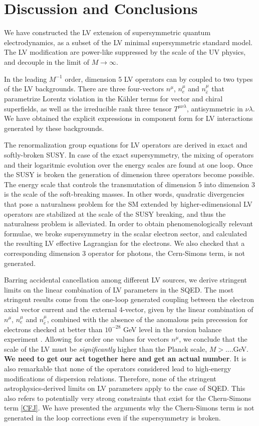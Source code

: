 \documentclass[paper,12pt]{revtex4}
\begin{document}
\section{Discussion and Conclusions}

We have constructed the LV extension of supersymmetric quantum electrodynamics,
as a subset of the LV minimal supersymmetric standard model.
The LV modification are power-like suppressed by the scale of the UV physics,
and decouple in the limit of $M\to \infty$. 

In the leading $M^{-1}$ order, dimension 5 LV operators can by coupled to
two types of the LV backgrounds. There are three four-vectors $n^\mu$, $n^\mu_e$ and $n^{\mu}_{\bar e}$
that parametrize Lorentz violation in the K\"ahler terms for vector and chiral superfields, 
as well as the irreducible rank three tensor $T^{\mu\nu\lambda}$, antisymmetric in $\nu\lambda$. 
We have obtained the explicit expressions in component form for LV interactions generated by these 
backgrounds. 

The renormalization group equations for LV operators are derived 
in exact and softly-broken SUSY. In case of the exact supersymmetry, 
the mixing of operators and their logaritmic evolution over the energy scales are 
found at one loop. Once the SUSY is broken the generation of dimension 
three operators become possible. The energy scale that controls the transmutation 
of dimension 5 into dimension 3 is the scale of the soft-breaking masses. 
In other words, quadratic divergencies that pose a naturalness problem for the 
SM extended by higher-edimensional LV operators are stabilized at the scale of the 
SUSY breaking, and thus the naturalness problem is alleviated. 
In order to obtain phenomenologically relevant formulae, we broke supersymmetry in the
scalar electron sector, and calculated the resulting LV effective Lagrangian for the 
electrons. We also checked that a corresponding dimension 3 operator for photons, 
the Cern-Simons term, is not generated. 

Barring accidental cancellation among different LV sources, we derive 
stringent limits on the linear combination of LV parameters in the 
SQED. The most stringent results come from the one-loop generated 
coupling between the electron axial vector current and the external 
4-vector, given by the linear combination of $n^\mu$, $n^\mu_e$ and $n^{\mu}_{\bar e}$,
combined with the absence of the anomalous psin precession for 
electrons checked at better than $10^{-28}$ GeV level in the 
torsion balance experiment \cite{Heckel:1999sy}. Allowing for order one values for 
vectors $n^\mu$, we conclude that the scale of the LV must be {\em significantly}
higher than the Planck scale, $M> $....GeV. {\bf We need to get our act together here 
and get an actual number}. It is also remarkable that none of the 
operators considered lead to high-energy modifications of dispersion relations. 
Therefore, none of the stringent astrophysics-derived limits on LV parameters 
\cite{Ted1,GK} apply to the case of SQED. This also refers to potentially very strong 
 constraints that exist for the Chern-Simons term \ref{CFJ}. We have presented 
 the arguments why the Chern-Simons term is not generated in the loop corrections 
 even if the supersymmetry is broken. 
 
\end{document}
